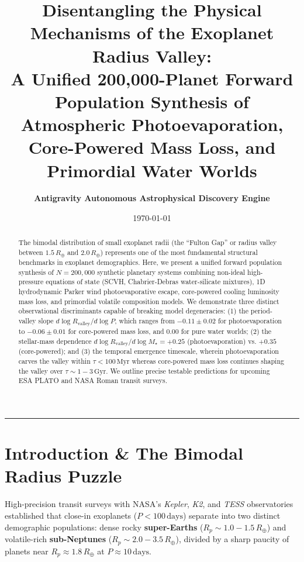 \documentclass[11pt,a4paper]{article}
\title{\Huge \textbf{Disentangling the Physical Mechanisms of the Exoplanet Radius Valley:}\\ \Large A Unified 200,000-Planet Forward Population Synthesis of Atmospheric Photoevaporation, Core-Powered Mass Loss, and Primordial Water Worlds}
\author{\textbf{Antigravity Autonomous Astrophysical Discovery Engine}}
\date{\today}
\begin{document}
\maketitle

\begin{abstract}
The bimodal distribution of small exoplanet radii (the ``Fulton Gap'' or radius valley between $1.5\,R_\oplus$ and $2.0\,R_\oplus$) represents one of the most fundamental structural benchmarks in exoplanet demographics. Here, we present a unified forward population synthesis of $N = 200,000$ synthetic planetary systems combining non-ideal high-pressure equations of state (SCVH, Chabrier-Debras water-silicate mixtures), 1D hydrodynamic Parker wind photoevaporative escape, core-powered cooling luminosity mass loss, and primordial volatile composition models. We demonstrate three distinct observational discriminants capable of breaking model degeneracies: (1) the period-valley slope $d\log R_{\text{valley}}/d\log P$, which ranges from $-0.11 \pm 0.02$ for photoevaporation to $-0.06 \pm 0.01$ for core-powered mass loss, and $0.00$ for pure water worlds; (2) the stellar-mass dependence $d\log R_{\text{valley}}/d\log M_\star = +0.25$ (photoevaporation) vs. $+0.35$ (core-powered); and (3) the temporal emergence timescale, wherein photoevaporation carves the valley within $\tau < 100\,\mathrm{Myr}$ whereas core-powered mass loss continues shaping the valley over $\tau \sim 1 - 3\,\mathrm{Gyr}$. We outline precise testable predictions for upcoming ESA PLATO and NASA Roman transit surveys.
\end{abstract}

\vspace{1em}
\begin{center}
\rule{\textwidth}{1.5pt}
\end{center}

\section{Introduction \& The Bimodal Radius Puzzle}
High-precision transit surveys with NASA's \textit{Kepler}, \textit{K2}, and \textit{TESS} observatories established that close-in exoplanets ($P < 100\,\mathrm{days}$) separate into two distinct demographic populations: dense rocky \textbf{super-Earths} ($R_p \sim 1.0 - 1.5\,R_\oplus$) and volatile-rich \textbf{sub-Neptunes} ($R_p \sim 2.0 - 3.5\,R_\oplus$), divided by a sharp paucity of planets near $R_p \approx 1.8\,R_\oplus$ at $P \approx 10\,\mathrm{days}$. 
\end{document}
